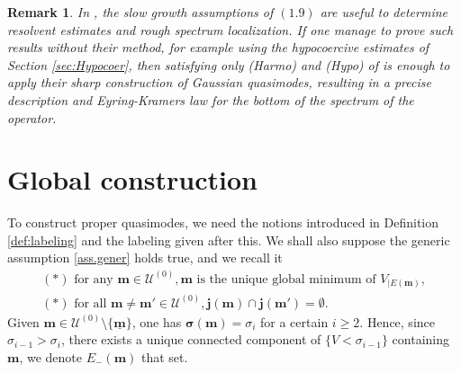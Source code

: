 \documentclass[12pt]{amsart}
\newcommand{\bsigma}{\boldsymbol{\sigma}}
\numberwithin{equation}{section}
\numberwithin{figure}{section}
\def\m{\mathbf{m}}
\def\j{\mathbf{j}}
\def\um{\underline{\m}}
\newtheorem{remark}[defin]{Remark}
\def\uuu{{\mathcal U}}\def\vvv{{\mathcal V}}\def\www{{\mathcal W}}\def\xxx{{\mathcal X}}
\begin{document}
\begin{remark}
    In \cite{BoLePMi22}, the slow growth assumptions of $(1.9)$ are useful to determine resolvent estimates and rough spectrum localization. If one manage to prove such results without their method, for example using the hypocoercive estimates of Section \ref{sec:Hypocoer}, then satisfying only (Harmo) and (Hypo) of \cite{BoLePMi22} is enough to apply their sharp construction of Gaussian quasimodes, resulting in a precise description and Eyring-Kramers law for the bottom of the spectrum of the operator.
\end{remark}











































\section{Global construction}\label{sec:global}

To %
construct proper quasimodes, we need the notions introduced in Definition \ref{def:labeling} and the labeling given after this. We shall also suppose the generic assumption \eqref{ass.gener} holds true, and we recall it
\begin{equation*}\tag{Gener}
\begin{array}{l}
    (\ast)\mbox{ for any }\m\in\uuu^{(0)},\m \mbox{ is the unique global minimum of } V_{|E(\m)},\\
    (\ast)\mbox{ for all }\m\neq\m'\in\uuu^{(0)},\j(\m)\cap\j(\m')=\emptyset.
\end{array}
\end{equation*}
Given $\m\in\uuu^{(0)}\setminus\{\um\}$, one has $\bsigma(\m) = \sigma_i$ for a certain $i\geq2$. Hence, since $\sigma_{i-1} > \sigma_i$, there exists a unique connected component of $\{V<\sigma_{i-1}\}$ containing $\m$, we denote $E_-(\m)$ that set.
\end{document}
